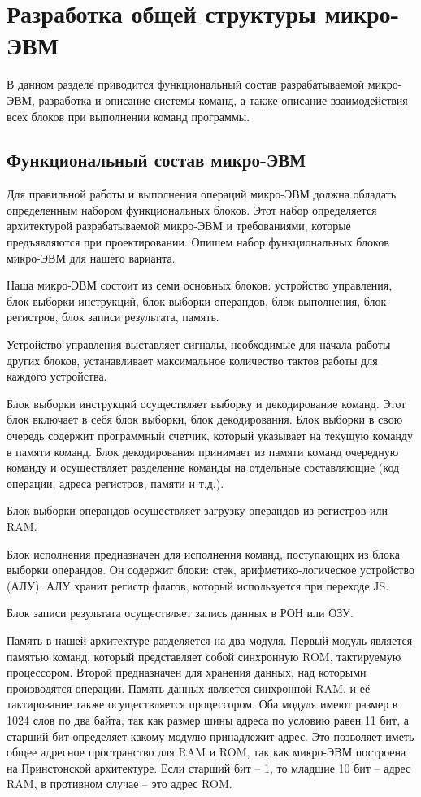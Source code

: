 \section{Разработка общей структуры микро-ЭВМ}
\label{sec:domain}

В данном разделе приводится функциональный состав разрабатываемой микро-ЭВМ, разработка и описание системы команд, а также описание взаимодействия всех блоков при выполнении команд программы.

\subsection{Функциональный состав микро-ЭВМ}
Для правильной работы и выполнения операций микро-ЭВМ должна обладать определенным набором функциональных блоков. Этот набор определяется архитектурой разрабатываемой микро-ЭВМ и требованиями, которые предъявляются при проектировании. Опишем набор функциональных блоков микро-ЭВМ для нашего варианта.

Наша микро-ЭВМ состоит из семи основных блоков: устройство управления, блок выборки инструкций, блок выборки операндов, блок выполнения, блок регистров, блок записи результата, память.

Устройство управления выставляет сигналы, необходимые для начала работы других блоков, устанавливает максимальное количество тактов работы для каждого устройства.

Блок выборки инструкций осуществляет выборку и декодирование команд. Этот блок включает в себя блок выборки, блок декодирования. Блок выборки в свою очередь содержит программный счетчик, который указывает на текущую команду в памяти команд. Блок декодирования принимает из памяти команд очередную команду и осуществляет разделение команды на отдельные составляющие (код операции, адреса регистров, памяти и т.д.).

Блок выборки операндов осуществляет загрузку операндов из регистров или RAM.

Блок исполнения предназначен для исполнения команд, поступающих из блока выборки операндов.
Он содержит блоки: стек, арифметико-логическое устройство (АЛУ). АЛУ хранит регистр флагов, который используется при переходе JS.

Блок записи результата осуществляет запись данных в РОН или ОЗУ.

Память в нашей архитектуре разделяется на два модуля.
Первый модуль является памятью команд, который представляет собой синхронную ROM,
тактируемую процессором.
Второй предназначен для хранения данных, над которыми производятся операции.
Память данных является синхронной RAM, и её тактирование также осуществляется процессором.
Оба модуля имеют размер в 1024 слов по два байта, так как размер шины адреса по условию равен 11 бит, а старший бит определяет какому модулю принадлежит адрес. Это позволяет иметь общее адресное пространство для RAM и ROM, так как микро-ЭВМ построена на Принстонской архитектуре. Если старший бит -- 1, то младшие 10 бит -- адрес RAM, в противном случае -- это адрес ROM.

